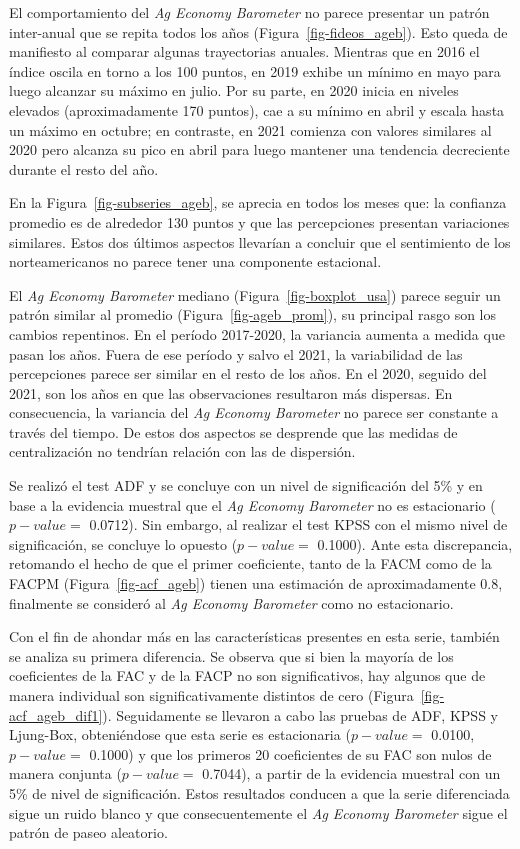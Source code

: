 \documentclass[12pt]{article}
\begin{document}
El comportamiento del \emph{Ag Economy Barometer} no parece presentar un
patrón inter-anual que se repita todos los años
(Figura~\ref{fig-fideos_ageb}). Esto queda de manifiesto al comparar
algunas trayectorias anuales. Mientras que en 2016 el índice oscila en
torno a los 100 puntos, en 2019 exhibe un mínimo en mayo para luego
alcanzar su máximo en julio. Por su parte, en 2020 inicia en niveles
elevados (aproximadamente 170 puntos), cae a su mínimo en abril y escala
hasta un máximo en octubre; en contraste, en 2021 comienza con valores
similares al 2020 pero alcanza su pico en abril para luego mantener una
tendencia decreciente durante el resto del año.

En la Figura~\ref{fig-subseries_ageb}, se aprecia en todos los meses
que: la confianza promedio es de alrededor 130 puntos y que las
percepciones presentan variaciones similares. Estos dos últimos aspectos
llevarían a concluir que el sentimiento de los norteamericanos no parece
tener una componente estacional.

El \emph{Ag Economy Barometer} mediano (Figura~\ref{fig-boxplot_usa})
parece seguir un patrón similar al promedio
(Figura~\ref{fig-ageb_prom}), su principal rasgo son los cambios
repentinos. En el período 2017-2020, la variancia aumenta a medida que
pasan los años. Fuera de ese período y salvo el 2021, la variabilidad de
las percepciones parece ser similar en el resto de los años. En el 2020,
seguido del 2021, son los años en que las observaciones resultaron más
dispersas. En consecuencia, la variancia del \emph{Ag Economy Barometer}
no parece ser constante a través del tiempo. De estos dos aspectos se
desprende que las medidas de centralización no tendrían relación con las
de dispersión.

Se realizó el test ADF y se concluye con un nivel de significación del
5\% y en base a la evidencia muestral que el \emph{Ag Economy Barometer}
no es estacionario (\(p-value=\) 0.0712). Sin embargo, al realizar el
test KPSS con el mismo nivel de significación, se concluye lo opuesto
(\(p-value=\) 0.1000). Ante esta discrepancia, retomando el hecho de que
el primer coeficiente, tanto de la FACM como de la FACPM
(Figura~\ref{fig-acf_ageb}) tienen una estimación de aproximadamente
0.8, finalmente se consideró al \emph{Ag Economy Barometer} como no
estacionario.

Con el fin de ahondar más en las características presentes en esta
serie, también se analiza su primera diferencia. Se observa que si bien
la mayoría de los coeficientes de la FAC y de la FACP no son
significativos, hay algunos que de manera individual son
significativamente distintos de cero (Figura~\ref{fig-acf_ageb_dif1}).
Seguidamente se llevaron a cabo las pruebas de ADF, KPSS y Ljung-Box,
obteniéndose que esta serie es estacionaria (\(p-value=\) 0.0100,
\(p-value=\) 0.1000) y que los primeros 20 coeficientes de su FAC son
nulos de manera conjunta (\(p-value=\) 0.7044), a partir de la evidencia
muestral con un 5\% de nivel de significación. Estos resultados conducen
a que la serie diferenciada sigue un ruido blanco y que consecuentemente
el \emph{Ag Economy Barometer} sigue el patrón de paseo aleatorio.
\end{document}
